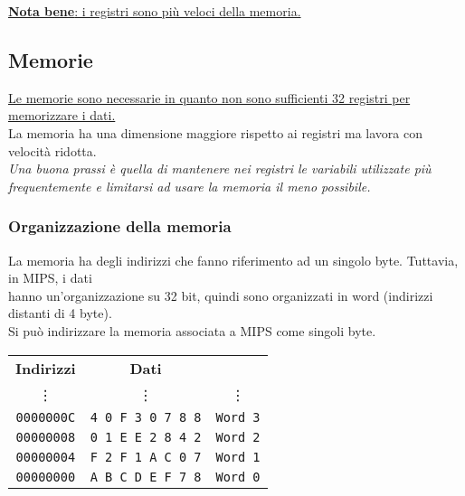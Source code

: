 \documentclass[../main.tex]{subfiles}
\begin{document}
\noindent
\underline{\textbf{Nota bene}: i registri sono più veloci della memoria.}

\newpage

\subsection{Memorie}
\underline{Le memorie sono necessarie in quanto non sono sufficienti
32 registri per memorizzare i dati.}
\\[3mm] La memoria ha una dimensione maggiore rispetto ai registri
ma lavora con velocità ridotta.
\\[1mm] \textit{Una buona prassi è quella di mantenere nei registri le variabili utilizzate
più frequentemente e limitarsi ad usare la memoria il meno possibile.}
\subsubsection*{Organizzazione della memoria}
La memoria ha degli indirizzi che fanno riferimento ad un singolo byte.
\hspace*{-.5mm}Tuttavia, in MIPS, i dati\\hanno un'organizzazione su 32 bit,
quindi sono organizzati in word (indirizzi distanti di 4 byte).
\\Si può indirizzare la memoria associata a MIPS come singoli byte.
\begin{table}[htb!]
    \centering

    \setlength{\tabcolsep}{18pt}
    \begin{tabular}{ c | c | c}
        \multicolumn{1}{c}{\textbf{Indirizzi}} & \multicolumn{1}{c}{\textbf{Dati}} \\
        \vdots & \vdots & \vdots \\
        \cline{2-2}
        \texttt{0000000C} & \texttt{4 0 F 3 0 7 8 8} & \texttt{Word 3} \\
        \cline{2-2}
        \texttt{00000008} & \texttt{0 1 E E 2 8 4 2} & \texttt{Word 2} \\
        \cline{2-2}
        \texttt{00000004} & \texttt{F 2 F 1 A C 0 7} & \texttt{Word 1} \\
        \cline{2-2}
        \texttt{00000000} & \texttt{A B C D E F 7 8} & \texttt{Word 0} \\
        \cline{2-2}
    \end{tabular}
\end{table}
\end{document}
